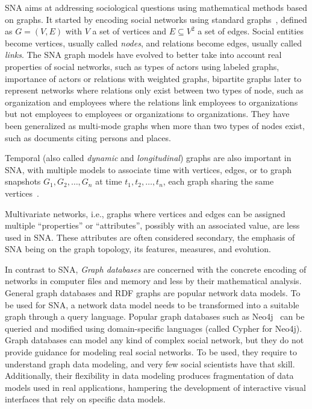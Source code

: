 SNA aims at addressing sociological questions using mathematical methods based on graphs. It started by encoding social networks using standard graphs~\cite{freeman2004development}, defined as $G = (V, E)$ with $V$ a set of vertices and $E \subseteq V^2$ a set of edges. Social entities become vertices, usually called \emph{nodes}, and relations become edges, usually called \emph{links}.
The SNA graph models have evolved to better take into account real properties of social networks, such as types of actors using labeled graphs,
importance of actors or relations with weighted graphs,
%
bipartite graphs later to represent networks where relations only exist between two types of node, such as organization and employees where the relations link employees to organizations but not employees to employees or organizations to organizations. They have been generalized as multi-mode graphs when more than two types of nodes exist, such as documents citing persons and places.

Temporal (also called \emph{dynamic} and \emph{longitudinal}) graphs are also important in SNA, with multiple models to associate time with vertices, edges, or to graph snapshots $G_1, G_2, \ldots, G_n$ at time $t_1, t_2, \ldots, t_n$, each graph sharing the same vertices~\cite{STARDynGraphs}.

Multivariate networks, i.e.,  graphs where vertices and edges can be assigned multiple ``properties'' or ``attributes'', possibly with an associated value, are less used in SNA\@. These attributes are often considered secondary, the emphasis of SNA being on the graph topology, its features, measures, and evolution.

In contrast to SNA, \emph{Graph databases} are concerned with the concrete encoding of networks in computer files and memory and less by their mathematical analysis. General graph databases and RDF graphs are popular network data models.
To be used for SNA, a network data model needs to be transformed into a suitable graph through a query language.
Popular graph databases such as Neo4j~\cite{neo4j} can be queried and modified using domain-specific languages (called Cypher for Neo4j). Graph databases can model any kind of complex social network, but they do not provide guidance for modeling real social networks. To be used, they require to understand graph data modeling, and very few social scientists have that skill. Additionally, their flexibility in data modeling produces fragmentation of data models used in real applications, hampering the development of interactive visual interfaces that rely on specific data models.

